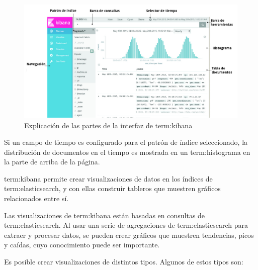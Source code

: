 \begin{figure}
  \includegraphics[width=\linewidth]{src/images/05-capitulo-5/kibana-ux.png}
  \caption{Explicación de las partes de la interfaz de \gls{term:kibana}}
  \label{fig:kibana-ux}
\end{figure}


Si un campo de tiempo es configurado para el patrón de índice seleccionado, la
distribución de documentos en el tiempo es mostrada en un \gls{term:histograma}
en la parte de arriba de la página.

\gls{term:kibana} permite crear visualizaciones de datos en los índices de
\gls{term:elasticsearch}, y con ellas construir tableros que muestren
gráficos relacionados entre sí.

Las visualizaciones de \gls{term:kibana} están basadas en consultas de
\gls{term:elasticsearch}. Al usar una serie de agregaciones de
\gls{term:elasticsearch} para extraer y procesar datos, se pueden crear
gráficos que muestren tendencias, picos y caídas, cuyo conocimiento puede ser
importante.

Es posible crear visualizaciones de distintos tipos. Algunos de estos tipos son:

